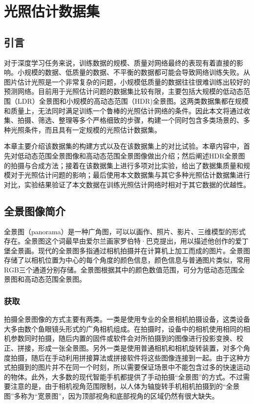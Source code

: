 \chapter{光照估计数据集}\label{chap:dataset}
\section{引言}
对于深度学习任务来说，训练数据的规模、质量对网络最终的表现有着直接的影响。小规模的数据、低质量的数据、不平衡的数据都可能会导致网络训练失败。从图片估计光照是一个非常复杂的问题，小规模低质量的数据往往很难训练出较好的预测网络。目前用于光照估计问题的数据集比较有限，主要包括大规模的低动态范围（LDR）全景图和小规模的高动态范围（HDR)全景图。这两类数据集都在规模和质量上，无法同时满足训练一个鲁棒的光照估计网络的条件。因此本文将通过收集、拍摄、筛选、整理等多个严格细致的步骤，构建一个同时包含多类场景的、多种光照条件，而且具有一定规模的光照估计数据集。

本章主要介绍该数据集的构建方式以及在该数据集上的对比试验。本章内容中，首先对低动态范围全景图像和高动态范围全景图像做出介绍；然后阐述HDR全景图的拍摄与合成方法；接着在该数据集上进行多项对比实验，给出了数据集质量和规模对于光照估计问题的影响；最后使用本文数据集与其它多种光照估计数据集进行对比，实验结果验证了本文数据在训练光照估计网络时相对于其它数据的优越性。

\section{全景图像简介}
全景图（panorama）是一种广角图，可以以画作、照片、影片、三维模型的形式存在。全景图这个词最早由爱尔兰画家罗伯特·巴克提出，用以描述他创作的爱丁堡全景画。现代的全景图多指通过相机拍摄并在计算机上加工而成的图片\cite{wikipedia}。全景图存储了以相机位置为中心的每个角度的颜色信息，颜色信息与普通图片类似，常用RGB三个通道分别存储。全景图根据其中的颜色数值范围，可分为低动态范围全景图和高动态范围全景图。

\subsection{获取}
拍摄全景图像的方式主要有两类。一类是使用专业的全景相机拍摄设备，这类设备大多由数个鱼眼镜头形式的广角相机组成。在拍摄时，设备中的相机使用相同的相机参数同时拍摄，随后内置的固件或软件会对所拍摄到的图像进行投影变换、校正、拼接，形成一张全景图。另外一类是使用普通相机和相机旋转装置，对多个角度拍摄，随后在手动利用拼接算法或拼接软件将这些图像连接到一起。由于这种方式拍摄到的图片并不在同一个时刻，所以需要保证场景中不能包含过多的快速运动的物体。此外，大多数的现代智能手机都提供了手动拍摄“全景图”的方式。不过需要注意的是，由于相机视角范围限制，以人体为轴旋转手机相机拍摄到的“全景图”多称为“宽景图”，因为顶部视角和底部视角的区域仍然有很大缺失。

